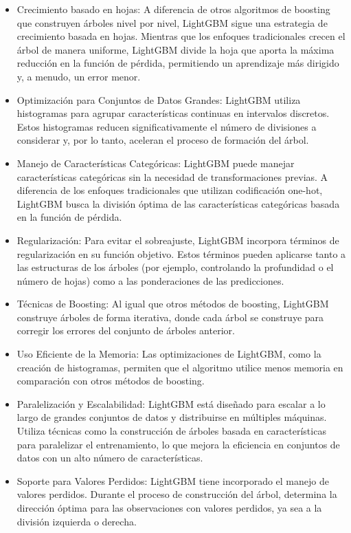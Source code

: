 \documentclass[12pt]{article}
\begin{document}
\begin{itemize}
  \item Crecimiento basado en hojas: A diferencia de otros algoritmos de boosting que construyen árboles nivel por nivel, LightGBM sigue una estrategia de crecimiento basada en hojas. Mientras que los enfoques tradicionales crecen el árbol de manera uniforme, LightGBM divide la hoja que aporta la máxima reducción en la función de pérdida, permitiendo un aprendizaje más dirigido y, a menudo, un error menor.
  \item Optimización para Conjuntos de Datos Grandes: LightGBM utiliza histogramas para agrupar características continuas en intervalos discretos. Estos histogramas reducen significativamente el número de divisiones a considerar y, por lo tanto, aceleran el proceso de formación del árbol.
  \item Manejo de Características Categóricas: LightGBM puede manejar características categóricas sin la necesidad de transformaciones previas. A diferencia de los enfoques tradicionales que utilizan codificación one-hot, LightGBM busca la división óptima de las características categóricas basada en la función de pérdida.
  \item Regularización: Para evitar el sobreajuste, LightGBM incorpora términos de regularización en su función objetivo. Estos términos pueden aplicarse tanto a las estructuras de los árboles (por ejemplo, controlando la profundidad o el número de hojas) como a las ponderaciones de las predicciones.
  \item Técnicas de Boosting: Al igual que otros métodos de boosting, LightGBM construye árboles de forma iterativa, donde cada árbol se construye para corregir los errores del conjunto de árboles anterior.
  \item Uso Eficiente de la Memoria: Las optimizaciones de LightGBM, como la creación de histogramas, permiten que el algoritmo utilice menos memoria en comparación con otros métodos de boosting.
  \item Paralelización y Escalabilidad: LightGBM está diseñado para escalar a lo largo de grandes conjuntos de datos y distribuirse en múltiples máquinas. Utiliza técnicas como la construcción de árboles basada en características para paralelizar el entrenamiento, lo que mejora la eficiencia en conjuntos de datos con un alto número de características.
  \item Soporte para Valores Perdidos: LightGBM tiene incorporado el manejo de valores perdidos. Durante el proceso de construcción del árbol, determina la dirección óptima para las observaciones con valores perdidos, ya sea a la división izquierda o derecha.
\end{itemize}
\end{document}
